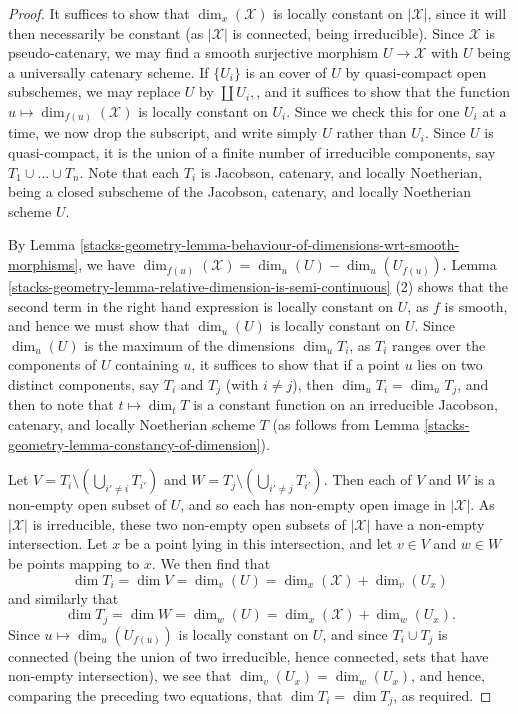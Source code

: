 \begin{proof}
It suffices to show that $\dim_x(\mathcal{X})$ is locally constant on
$|\mathcal{X}|$,
since it will then necessarily be constant (as $|\mathcal{X}|$ is connected,
being irreducible).  Since $\mathcal{X}$ is pseudo-catenary,
we may find a smooth surjective morphism $U \to \mathcal{X}$ with $U$
being a universally catenary scheme.  If $\{U_i\}$ is an
cover of $U$ by quasi-compact open subschemes, we may replace
$U$ by $\coprod U_i,$, and
it suffices to show that
the function $u \mapsto \dim_{f(u)}(\mathcal{X})$ is locally constant on $U_i$.
Since we check this for one $U_i$ at a time, we now drop the subscript,
and write simply $U$ rather than $U_i$.
Since $U$ is quasi-compact, it
is the union of a finite number of irreducible components,
say $T_1 \cup \ldots \cup T_n$.  Note that each $T_i$ is Jacobson,
catenary, and locally Noetherian,
being a closed subscheme of the Jacobson, catenary, and locally Noetherian
scheme $U$.

\medskip\noindent
By Lemma \ref{stacks-geometry-lemma-behaviour-of-dimensions-wrt-smooth-morphisms}, we have
$\dim_{f(u)}(\mathcal{X}) = \dim_{u}(U) - \dim_{u}(U_{f(u)}).$
Lemma \ref{stacks-geometry-lemma-relative-dimension-is-semi-continuous} (2)
shows that the second term in the right hand expression is locally
constant on $U$, as $f$ is smooth,
and hence we must show that $\dim_u(U)$
is locally constant on $U$.  Since $\dim_u(U)$ is the maximum
of the dimensions $\dim_u T_i$, as $T_i$ ranges over the components
of $U$ containing $u$, it suffices to show
that if a point $u$ lies on two distinct components,
say $T_i$ and $T_j$ (with $i \neq j$),
then $\dim_u T_i = \dim_u T_j$,
and then to note that $t\mapsto \dim_t T$ is a constant
function on an irreducible Jacobson,
catenary, and locally Noetherian scheme $T$
(as follows from Lemma \ref{stacks-geometry-lemma-constancy-of-dimension}).

\medskip\noindent
Let $V = T_i \setminus (\bigcup_{i' \neq i} T_{i'})$
and $W = T_j \setminus (\bigcup_{i' \neq j} T_{i'})$.
Then each of $V$ and $W$ is a non-empty open subset of $U$,
and so each has non-empty open image in $|\mathcal{X}|$.  As $|\mathcal{X}|$ is
irreducible,
these two non-empty open subsets of $|\mathcal{X}|$ have a non-empty
intersection.
Let $x$ be a point lying in this intersection, and let $v \in V$ and
$w\in W$ be points mapping to $x$.
We then find that
$$
\dim T_i = \dim V = \dim_v (U) = \dim_x (\mathcal{X}) + \dim_v (U_x)
$$
and similarly that
$$
\dim T_j = \dim W = \dim_w (U) = \dim_x (\mathcal{X}) + \dim_w (U_x).
$$
Since $u \mapsto \dim_u (U_{f(u)})$ is locally constant on $U$,
and since $T_i \cup T_j$ is connected (being the union of two irreducible,
hence connected, sets that have non-empty intersection),
we see that $\dim_v (U_x) = \dim_w(U_x)$,
and hence, comparing the preceding two equations,
that $\dim T_i = \dim T_j$, as required.
\end{proof}

